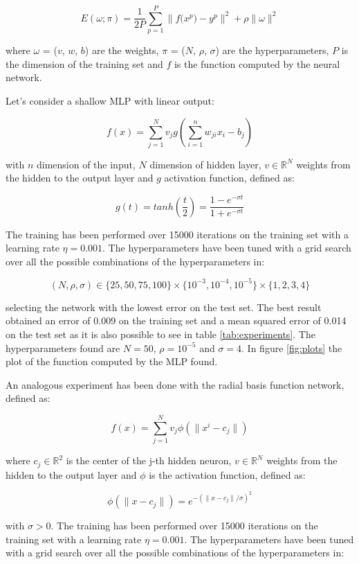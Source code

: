 \documentclass[a4paper]{article}
\numberwithin{equation}{section} %
\numberwithin{figure}{section} %
\numberwithin{table}{section} %
\theoremstyle{definition}
\begin{document}
\begin{equation}
  \label{eq:training-error}
  E(\omega; \pi) = \frac{1}{2P} \displaystyle\sum_{p=1}^{P} \| f\big(x^p\big) - y^p \|^2 + \rho \| \omega \|^2
\end{equation}

\noindent where $\omega$ = ($v$, $w$, $b$) are the weights,
$\pi$ = ($N$, $\rho$, $\sigma$) are the hyperparameters, $P$ is the dimension
of the training set and $f$ is the function computed by the neural network.

Let's consider a shallow MLP with linear output:

\[ f(x) = \displaystyle\sum_{j=1}^{N} v_j g\left(\displaystyle\sum_{i=1}^{n}w_{ji}x_i - b_j\right) \]

\noindent with $n$ dimension of the input, $N$ dimension of hidden layer, $v \in \mathbb{R}^N$
weights from the hidden to the output layer and
$g$ activation function, defined as:

\[ g(t) = tanh\left(\frac{t}{2}\right) = \frac{1-e^{-\sigma t}}{1+e^{-\sigma t}} \]

The training has been performed over 15000 iterations on the training set with
a learning rate $\eta = 0.001$. The hyperparameters have been tuned with a
grid search over all the possible combinations of the hyperparameters in:

\[ (N, \rho, \sigma) \in \Big\{25, 50, 75, 100\Big\} \times \Big\{10^{-3}, 10^{-4}, 10^{-5}\Big\}
\times \Big\{1, 2, 3, 4\Big\} \]

\noindent selecting the network with the lowest error on the test set.
The best result obtained an error of 0.009 on the training set and a mean squared error of
0.014 on the test set as it is also possible to see in table \ref{tab:experiments}.
The hyperparameters found are $N=50$, $\rho=10^{-5}$ and $\sigma=4$. In figure \ref{fig:plots}
the plot of the function computed by the MLP found.

An analogous experiment has been done with the radial basis function network,
defined as:

\[ f(x) = \displaystyle\sum_{j=1}^{N} v_j \phi(\| x^i - c_j \|) \]

where $c_j \in \mathbb{R}^2$ is the center of the j-th hidden neuron,
$v \in \mathbb{R}^N$ weights from the hidden to the output layer and $\phi$
is the activation function, defined as:

\[ \phi(\|x - c_j\|) = e^{-(\| x - c_j \|/\sigma)^2} \]

\noindent with $\sigma > 0$.
The training has been performed over 15000 iterations on the training set with
a learning rate $\eta = 0.001$. The hyperparameters have been tuned with a
grid search over all the possible combinations of the hyperparameters in:
\end{document}
